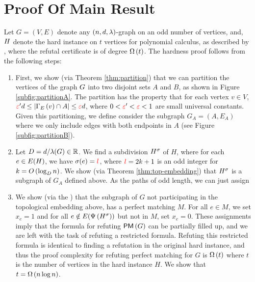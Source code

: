 \documentclass[11pt]{article}
\begin{document}
\section{Proof Of Main Result}
\label{sec:main-proof}

Let $G=(V,E)$ denote any $(n, d, \lambda)$-graph on an odd number of vertices, and,  $H$ denote the hard instance on $t$ vertices for polynomial calculus, as described by \citet{buss1999linear}, where the refutal certificate is of degree $\Omega\left(t\right)$.
The hardness proof follows from the following steps:


\begin{enumerate}
	\item First, we show (via Theorem \ref{thm:partition}) that we can partition the vertices of the graph $G$ into two disjoint sets $A$ and $B$, as shown in Figure \ref{subfig:partitionA}. The partition has the property that for each vertex $v \in V$, $\textcolor{red}{\varepsilon}'d \leq |\Gamma_{E}\left(v\right) \cap A| \leq \textcolor{red}{\varepsilon} d$, where $0 <\textcolor{red}{\varepsilon} '< \textcolor{red}{\varepsilon} < 1$ are small universal constants. Given this partitioning, we define consider the subgraph $G_A = (A, E_A)$ where we only include edges with both endpoints in $A$ (see Figure \ref{subfig:partitionB}).
	\item Let $D = d/\lambda(G) \in \mathbb{R}$. We find a subdivision ${H}^{\sigma}$ of $H$, where for each $e \in E(H)$, we have $\sigma(e) = \textcolor{red}{l}$, where $\textcolor{red}{l} = 2k+1$ is an odd integer for $k = O\left(\log_{D} n\right)$. We show (via Theorem \ref{thm:top-embedding}) that ${H}^{\sigma}$ is a subgraph of $G_A$ defined above. As the paths of odd length, we can just assign 
	
	\item We show (via the ) that the subgraph of $G$ not participating in the topological embedding above, has a perfect matching $M$. For all $e \in M$, we set $x_e = 1$ and for all $e \notin E(\Psi\left({H}^{\sigma}\right))$ but not in $M$, set $x_e = 0$. These assignments imply that the formula for refuting $\mathsf{PM}\left(G\right)$ can be partially filled up, and we are left with the task of refuting a restricted formula. Refuting this restricted formula is identical to finding a refutation in the original hard instance, and thus the proof complexity for refuting perfect matching for $G$ is $\Omega\left(t\right)$ where $t$ is the number of vertices in the hard instance $H$. We show that $t = \Omega\left(n\log n\right)$.
\end{enumerate}
\end{document}
